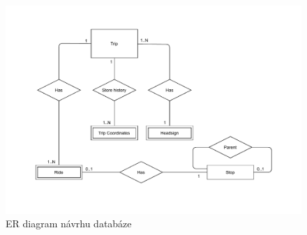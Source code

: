 \begin{figure}[p]\centering
\includegraphics[width=\linewidth]{../img/er_diagram}
\caption{ER diagram návrhu databáze}
\label{obr:ER}
\end{figure}


